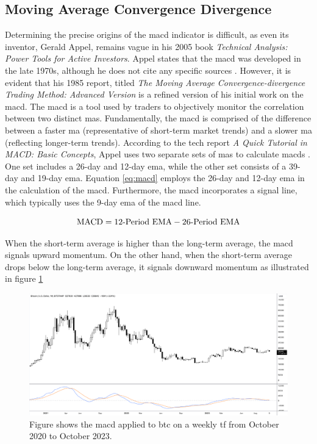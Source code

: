 \subsection{Moving Average Convergence Divergence}
\label{sub:MACD}
Determining the precise origins of the \gls{macd} indicator is difficult, as even its inventor, Gerald Appel, remains vague in his 2005 book \textit{Technical Analysis: Power Tools for Active Investors}. Appel states that the \gls{macd} was developed in the late 1970s, although he does not cite any specific sources \citep{appel2005technical}. However, it is evident that his 1985 report, titled \textit{The Moving Average Convergence-divergence Trading Method: Advanced Version} \citep{appel1985moving} is a refined version of his initial work on the \gls{macd}.
\newline
\newline
The \gls{macd} is a tool used by traders to objectively monitor the correlation between two distinct \glspl{ma}. Fundamentally, the \gls{macd} is comprised of the difference between a faster \gls{ma} (representative of short-term market trends) and a slower \gls{ma} (reflecting longer-term trends). According to the tech report \textit{A Quick Tutorial in MACD: Basic Concepts}, Appel uses two separate sets of \glspl{ma} to calculate \glspl{macd} \citep{appel2008quick}. One set includes a 26-day and 12-day \gls{ema}, while the other set consists of a 39-day and 19-day \gls{ema}. Equation \ref{eq:macd} employs the 26-day and 12-day \gls{ema} in the calculation of the \gls{macd}. Furthermore, the \gls{macd} incorporates a signal line, which typically uses the 9-day \gls{ema} of the \gls{macd} line.

\begin{equation}
    \centering
    \text{MACD} = \text{12-Period} \text{ EMA} - \text{26-Period} \text{ EMA}
    \label{eq:macd}
\end{equation}

\noindent
When the short-term average is higher than the long-term average, the \gls{macd} signals upward momentum. On the other hand, when the short-term average drops below the long-term average, it signals downward momentum as illustrated in figure \ref{fig:macd_momentum}

\begin{figure}[ht]
    \centering
    \includegraphics[width=\textwidth]{./assets/img/bitcoin_macd.png}
    \caption{Figure shows the \gls{macd} applied to \gls{btc} on a weekly \gls{tf} from October 2020 to October 2023.}
    \label{fig:macd_momentum}
\end{figure}

